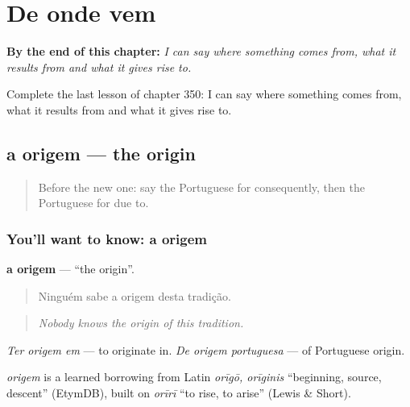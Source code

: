 
\chapter{De onde vem}
\label{ch:pt-de-onde-vem}

\begin{chapteropening}
\textbf{By the end of this chapter:} \emph{I can say where something comes from, what it results from and what it gives rise to.}

Complete the last lesson of chapter 350: I can say where something comes from, what it results from and what it gives rise to.
\end{chapteropening}

\section[a origem]{a origem — the origin}

\label{lesson:PT-C350-origem}



\begin{quote}
Before the new one: say the Portuguese for consequently, then the Portuguese for due to.
\end{quote}

\subsection*{You'll want to know: a origem}
\textbf{a origem} — \textquotedblleft{}the origin\textquotedblright{}.

\begin{quote}
Ninguém sabe a origem desta tradição.
\end{quote}

\begin{quote}
\emph{Nobody knows the origin of this tradition.}
\end{quote}

\emph{Ter origem em} — to originate in. \emph{De origem portuguesa} — of Portuguese origin.

\begin{cousinweb}
\emph{origem} is a learned borrowing from Latin \emph{orīgō, orīginis} \textquotedblleft{}beginning, source, descent\textquotedblright{} (EtymDB), built on \emph{orīrī} \textquotedblleft{}to rise, to arise\textquotedblright{} (Lewis \& Short).
\end{cousinweb}

